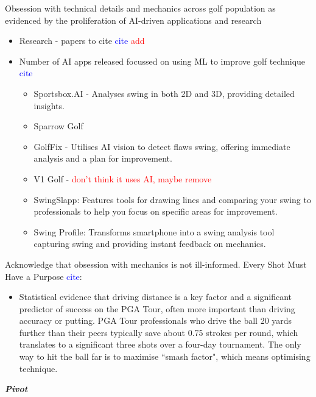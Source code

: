 \documentclass[11pt, letterpaper]{article}
\begin{document}
Obsession with technical details and mechanics across golf population as evidenced by the proliferation of AI-driven applications and research
\begin{itemize}
    \item Research - papers to cite \textcolor{blue}{cite} \textcolor{red}{add}
    \item Number of AI apps released focussed on using ML to improve golf technique \textcolor{blue}{cite}
    \begin{itemize}
        \item Sportsbox.AI - Analyses swing in both 2D and 3D, providing detailed insights.
        \item Sparrow Golf
        \item GolfFix - Utilises AI vision to detect flaws swing, offering immediate analysis and a plan for improvement.
        \item V1 Golf - \textcolor{red}{don't think it uses AI, maybe remove}
        \item  SwingSlapp: Features tools for drawing lines and comparing your swing to professionals to help you focus on specific areas for improvement.
        \item Swing Profile: Transforms smartphone into a swing analysis tool capturing swing and providing instant feedback on mechanics.
    \end{itemize}
\end{itemize}
Acknowledge that obsession with mechanics is not ill-informed. Every Shot Must Have a Purpose \textcolor{blue}{cite}:
    \begin{itemize}
        \item Statistical evidence that driving distance is a key factor and a significant predictor of success on the PGA Tour, often more important than driving accuracy or putting. PGA Tour professionals who drive the ball 20 yards further than their peers typically save about 0.75 strokes per round, which translates to a significant three shots over a four-day tournament. The only way to hit the ball far is to maximise ``smash factor", which means optimising technique.
    \end{itemize}

\textbf{\emph{Pivot}}
\end{document}
